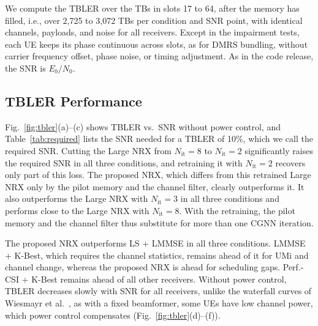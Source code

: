 We compute the TBLER over the TBs in slots 17 to 64, after the memory has filled, i.e., over 2{,}725 to 3{,}072 TBs per condition and SNR point, with identical channels, payloads, and noise for all receivers. Except in the impairment tests, each UE keeps its phase continuous across slots, as for DMRS bundling, without carrier frequency offset, phase noise, or timing adjustment. As in the code release, the SNR is $E_b/N_0$.

\subsection{TBLER Performance}
Fig.~\ref{fig:tbler}(a)--(c) shows TBLER vs.\ SNR without power control, and Table~\ref{tab:required} lists the SNR needed for a TBLER of 10\%, which we call the required SNR. Cutting the Large NRX from $N_{\mathrm{it}}=8$ to $N_{\mathrm{it}}=2$ significantly raises the required SNR in all three conditions, and retraining it with $N_{\mathrm{it}}=2$ recovers only part of this loss. The proposed NRX, which differs from this retrained Large NRX only by the pilot memory and the channel filter, clearly outperforms it. It also outperforms the Large NRX with $N_{\mathrm{it}}=3$ in all three conditions and performs close to the Large NRX with $N_{\mathrm{it}}=8$. With the retraining, the pilot memory and the channel filter thus substitute for more than one CGNN iteration.

\begin{table}[t]
\centering
\caption{Required SNR [dB] for a TBLER of 10\% with 16-QAM (MCS index $i=14$).}
\label{tab:required}
\scriptsize\setlength{\tabcolsep}{3.5pt}

\end{table}

The proposed NRX outperforms LS + LMMSE in all three conditions. LMMSE + K-Best, which requires the channel statistics, remains ahead of it for UMi and channel change, whereas the proposed NRX is ahead for scheduling gaps. Perf.-CSI + K-Best remains ahead of all other receivers. Without power control, TBLER decreases slowly with SNR for all receivers, unlike the waterfall curves of Wiesmayr et al.~\cite{wiesmayr2025realtime}, as with a fixed beamformer, some UEs have low channel power, which power control compensates (Fig.~\ref{fig:tbler}(d)--(f)).

\begin{table}[t]
\centering
\caption{TBLER [\%] of the Large NRX with $N_{\mathrm{it}}=8$ and the proposed NRX with and without memory on two further datasets, at 2, 2, 5, 4, 8, 3, 9, 17, and 3\,dB from the top.}
\label{tab:further}
\scriptsize\setlength{\tabcolsep}{3.5pt}

\end{table}


